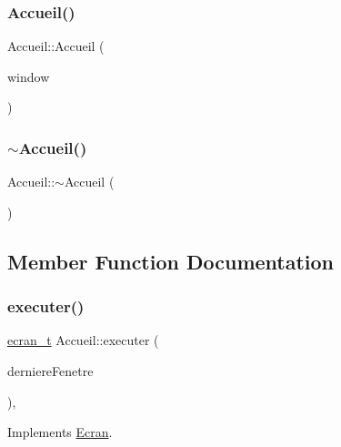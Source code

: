 \subsubsection{\texorpdfstring{Accueil()}{Accueil()}}
{\footnotesize\ttfamily Accueil\+::\+Accueil (\begin{DoxyParamCaption}\item[{sf\+::\+Render\+Window \&}]{window }\end{DoxyParamCaption})}

\mbox{\label{class_accueil_a42a925af8942c76a73957ac9abcd45d7}} 
\subsubsection{\texorpdfstring{$\sim$\+Accueil()}{~Accueil()}}
{\footnotesize\ttfamily Accueil\+::$\sim$\+Accueil (\begin{DoxyParamCaption}{ }\end{DoxyParamCaption})\hspace{0.3cm}{\ttfamily [inline]}}



\subsection{Member Function Documentation}
\mbox{\label{class_accueil_adfc33857bbaeedd9cac862b90bb79e4e}} 
\subsubsection{\texorpdfstring{executer()}{executer()}}
{\footnotesize\ttfamily \mbox{\hyperlink{constantes_8h_a33e4f15dde10f34860a6b35be343ae56}{ecran\+\_\+t}} Accueil\+::executer (\begin{DoxyParamCaption}\item[{sf\+::\+Texture \&}]{derniere\+Fenetre }\end{DoxyParamCaption})\hspace{0.3cm}{\ttfamily [override]}, {\ttfamily [virtual]}}



Implements \mbox{\hyperlink{class_ecran_a764dadf20079744d3f5dd633eae268cc}{Ecran}}.

